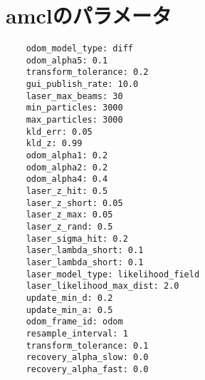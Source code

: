 
\appendix
\chapter{amclのパラメータ}
\begin{verbatim}
    odom_model_type: diff
    odom_alpha5: 0.1
    transform_tolerance: 0.2
    gui_publish_rate: 10.0
    laser_max_beams: 30
    min_particles: 3000
    max_particles: 3000
    kld_err: 0.05
    kld_z: 0.99
    odom_alpha1: 0.2
    odom_alpha2: 0.2
    odom_alpha4: 0.4
    laser_z_hit: 0.5
    laser_z_short: 0.05
    laser_z_max: 0.05
    laser_z_rand: 0.5
    laser_sigma_hit: 0.2
    laser_lambda_short: 0.1
    laser_lambda_short: 0.1
    laser_model_type: likelihood_field
    laser_likelihood_max_dist: 2.0
    update_min_d: 0.2
    update_min_a: 0.5
    odom_frame_id: odom
    resample_interval: 1
    transform_tolerance: 0.1
    recovery_alpha_slow: 0.0
    recovery_alpha_fast: 0.0
\end{verbatim}

